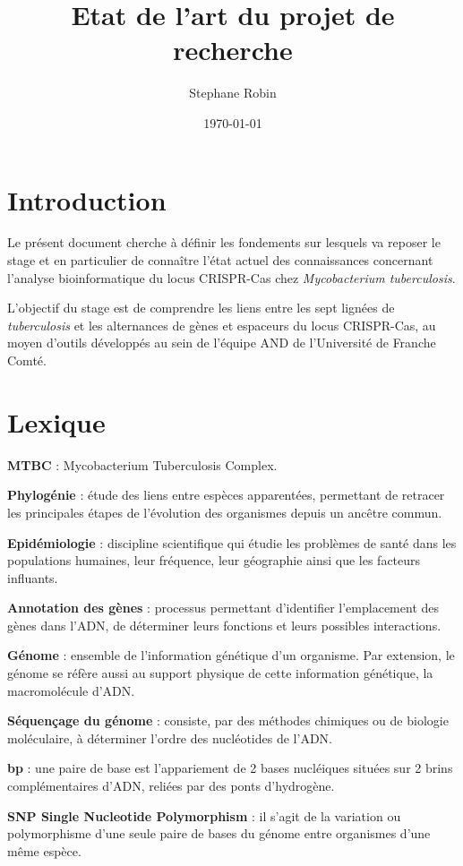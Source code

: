 \documentclass[twoside,a4paper,11pt,frenchb,openany]{report}
\title{Etat de l'art du projet de recherche}
\author{Stephane Robin}
\date{\today}
\begin{document}
\maketitle

\section{Introduction}

Le présent document cherche à définir les fondements sur lesquels va reposer le stage et en particulier de connaître l'état actuel des connaissances concernant l'analyse bioinformatique du locus CRISPR-Cas chez \textit{Mycobacterium tuberculosis}.

L'objectif du stage est de comprendre les liens entre les sept lignées de \textit{tuberculosis} et les alternances de gènes et espaceurs du locus CRISPR-Cas, au moyen d'outils développés au sein de l'équipe AND de l'Université de Franche Comté.

\section{Lexique}

\textbf{MTBC} : Mycobacterium Tuberculosis Complex.

\textbf{Phylogénie} : étude des liens entre espèces apparentées, permettant de retracer les principales étapes de l'évolution des organismes depuis un ancêtre commun.

\textbf{Epidémiologie} : discipline scientifique qui étudie les problèmes de santé dans les populations humaines, leur fréquence, leur géographie ainsi que les facteurs influants.

\textbf{Annotation des gènes} : processus permettant d'identifier l'emplacement des gènes dans l'ADN, de déterminer leurs fonctions et leurs possibles interactions.

\textbf{Génome} : ensemble de l'information génétique d'un organisme. Par extension, le génome se réfère aussi au support physique de cette information génétique, la macromolécule d'ADN.

\textbf{Séquençage du génome} : consiste, par des méthodes chimiques ou de biologie moléculaire, à déterminer l'ordre des nucléotides de l'ADN.

\textbf{bp} : une paire de base est l'appariement de 2 bases nucléiques situées sur 2 brins complémentaires d'ADN, reliées par des ponts d'hydrogène.

\textbf{SNP Single Nucleotide Polymorphism} : il s'agit de la variation ou polymorphisme d'une seule paire de bases du génome entre organismes d'une même espèce.
\end{document}
